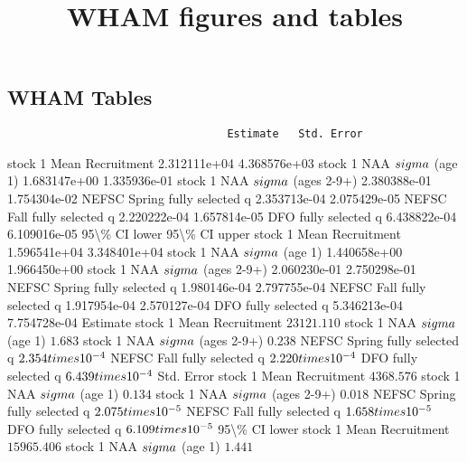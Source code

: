 \documentclass[
]{article}
\title{WHAM figures and tables}
\author{}
\date{\vspace{-2.5em}}
\begin{document}
\maketitle

\subsection{WHAM Tables}\label{wham-tables}

\begin{verbatim}
                                  Estimate   Std. Error
\end{verbatim}

stock 1 Mean Recruitment 2.312111e+04 4.368576e+03 stock 1 NAA
\(\\sigma\) (age 1) 1.683147e+00 1.335936e-01 stock 1 NAA \(\\sigma\)
(ages 2-9+) 2.380388e-01 1.754304e-02 NEFSC Spring fully selected q
2.353713e-04 2.075429e-05 NEFSC Fall fully selected q 2.220222e-04
1.657814e-05 DFO fully selected q 6.438822e-04 6.109016e-05
95\textbackslash\% CI lower 95\textbackslash\% CI upper stock 1 Mean
Recruitment 1.596541e+04 3.348401e+04 stock 1 NAA \(\\sigma\) (age 1)
1.440658e+00 1.966450e+00 stock 1 NAA \(\\sigma\) (ages 2-9+)
2.060230e-01 2.750298e-01 NEFSC Spring fully selected q 1.980146e-04
2.797755e-04 NEFSC Fall fully selected q 1.917954e-04 2.570127e-04 DFO
fully selected q 5.346213e-04 7.754728e-04 Estimate stock 1 Mean
Recruitment \(23121.110\) stock 1 NAA \(\\sigma\) (age 1) \(1.683\)
stock 1 NAA \(\\sigma\) (ages 2-9+) \(0.238\) NEFSC Spring fully
selected q \(2.354\\times 10^{-4}\) NEFSC Fall fully selected q
\(2.220\\times 10^{-4}\) DFO fully selected q \(6.439\\times 10^{-4}\)
Std. Error stock 1 Mean Recruitment \(4368.576\) stock 1 NAA \(\\sigma\)
(age 1) \(0.134\) stock 1 NAA \(\\sigma\) (ages 2-9+) \(0.018\) NEFSC
Spring fully selected q \(2.075\\times 10^{-5}\) NEFSC Fall fully
selected q \(1.658\\times 10^{-5}\) DFO fully selected q
\(6.109\\times 10^{-5}\) 95\textbackslash\% CI lower stock 1 Mean
Recruitment \(15965.406\) stock 1 NAA \(\\sigma\) (age 1) \(1.441\)
\end{document}
